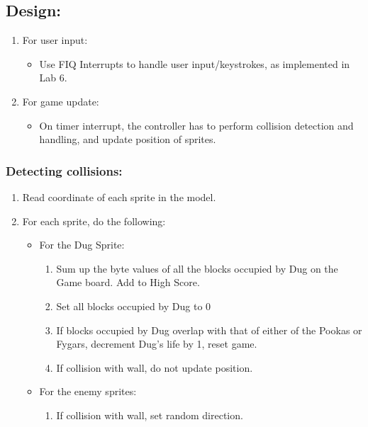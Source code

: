 \subsection{Design:}

\begin{enumerate}
  \item For user input:
  \begin{itemize}
    \item Use FIQ Interrupts to handle user input/keystrokes, as implemented in Lab 6.
  \end{itemize}
  
  \item For game update:
  \begin{itemize}
    \item On timer interrupt, the controller has to perform collision detection and handling, and update position of sprites.
  \end{itemize}
\end{enumerate}


\subsubsection{Detecting collisions:}

\begin{enumerate}
  \item Read coordinate of each sprite in the model.
  \item For each sprite, do the following:
  \begin{itemize}
    \item For the Dug Sprite:
    \begin{enumerate}
      \item Sum up the byte values of all the blocks occupied by Dug on the Game board. Add to High Score.
      \item Set all blocks occupied by Dug to 0
      \item If blocks occupied by Dug overlap with that of either of the Pookas or Fygars, decrement Dug's life by 1, reset game.
      \item If collision with wall, do not update position.
    \end{enumerate}

    \item For the enemy sprites:
    \begin{enumerate}
      \item If collision with wall, set random direction.
    \end{enumerate}
  \end{itemize}
  
\end{enumerate}



